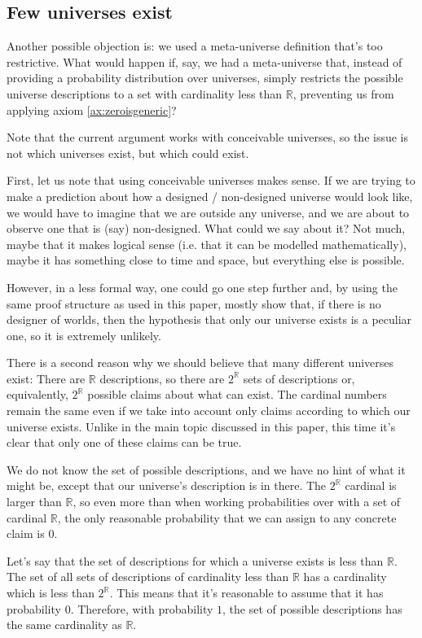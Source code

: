 \documentclass[a4paper
,draft
]{article}
\newcommand{\svn}[2][]{\todo[author=Virgil,color=red!25!white,#1]{#2}}
\def\reale{\mathbb{R}}
\begin{document}
\subsection{Few universes exist}
\label{sec:fewuniverses}

Another possible objection is: we used a meta-universe definition that's too
restrictive. What would happen if, say, we had a meta-universe that, instead
of providing a probability distribution over universes, simply restricts the
possible universe descriptions to a set with cardinality less than $\reale$,
preventing us from applying axiom \ref{ax:zeroisgeneric}?

Note that the current argument works with conceivable universes, so the issue
is not which universes exist, but which could exist.

First, let us note that using conceivable universes makes sense. If we are
trying to make a prediction about how a designed / non-designed universe would
look like, we would have to imagine that we are outside any universe, and we are
about to observe one that is (say) non-designed. What could we say about it?
Not much, maybe that it makes logical sense (i.e. that it can be modelled
mathematically), maybe it has something close to time and space, but
everything else is possible.

However, in a less formal way, one could go one step further and,
by using the same proof structure as used in this paper,
mostly show that, if there is no designer of worlds,
then the hypothesis that only our universe exists is a peculiar one, so it is
extremely unlikely.

There is a second reason why we should believe that many different universes
exist: There are $\reale$ descriptions, so there are $2^\reale$ sets of
descriptions or, equivalently, $2^\reale$ possible claims about what can exist.
The cardinal numbers remain the same even if we take into account only claims
according to which our universe exists.
Unlike in the main topic discussed in this
paper, this time it's clear that only one of these claims can be true.

We do not know the set of possible descriptions, and we have no hint
of what it might be, except that our universe's description is in there.
The $2^\reale$ cardinal is larger than $\reale$, so even more than when
working probabilities over with a set of cardinal $\reale$, the only reasonable
probability that we can assign to any concrete claim is $0$.

Let's say that the set of descriptions for which a universe exists is
less than $\reale$. The set of all sets of descriptions of cardinality less
than $\reale$ has a cardinality which is less than $2^\reale$.
This means that it's reasonable to assume that it has probability $0$\svn{why?}.
Therefore, with probability $1$, the set of possible descriptions has the same
cardinality as $\reale$.
\end{document}
